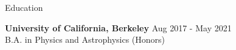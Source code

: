 \documentclass{resume} %
\begin{document}

\begin{rSection}{Education}

{\bf University of California, Berkeley} \hfill {Aug 2017 - May 2021} 
\\ B.A. in Physics and Astrophysics (Honors)\hfill {}



\end{rSection}

\end{document}

